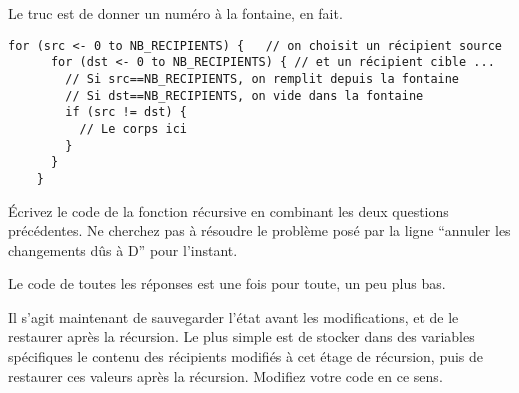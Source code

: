 \documentclass[10pt]{article}\usepackage[nu]{esial}%
\begin{document}
\begin{Reponse}
  Le truc est de donner un numéro à la fontaine, en fait. 
  \begin{Verbatim}[gobble=4]
    for (src <- 0 to NB_RECIPIENTS) {   // on choisit un récipient source 
      for (dst <- 0 to NB_RECIPIENTS) { // et un récipient cible ... 
        // Si src==NB_RECIPIENTS, on remplit depuis la fontaine
        // Si dst==NB_RECIPIENTS, on vide dans la fontaine
        if (src != dst) {
          // Le corps ici
        }
      }
    }
  \end{Verbatim}
\end{Reponse}

\Question Écrivez le code de la fonction récursive en combinant les deux
questions précédentes. Ne cherchez pas à résoudre le problème posé par la ligne
``annuler les changements dûs à D'' pour l'instant.

\begin{Reponse}
  Le code de toutes les réponses est une fois pour toute, un peu plus bas.
            

\end{Reponse}

\Question %
Il s'agit maintenant de sauvegarder l'état avant les modifications, et de le
restaurer après la récursion.  Le plus simple est de stocker dans des variables
spécifiques le contenu des récipients modifiés à cet étage de récursion, puis de
restaurer ces valeurs après la récursion. Modifiez votre code en ce sens.
\end{document}
